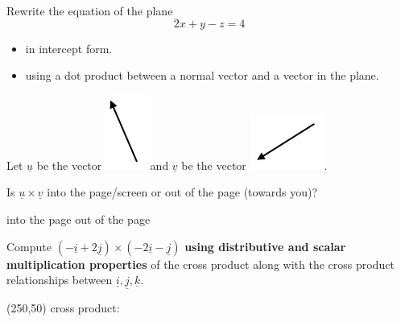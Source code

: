 \documentclass[12pt,letterpaper,noanswers]{exam}
\newcommand{\mb}[1]{\underline{#1}}
\begin{document}
 \pdfpageheight 11in 
  \pdfpagewidth 8.5in



\begin{questions}
\item Rewrite the equation of the plane
\[2x + y - z = 4 \]
\begin{itemize}
    \item in intercept form.
    \item using a dot product between a normal vector and a vector in the plane.
\end{itemize}

\vfill

\item \begin{parts}
\item Let $\mb{u}$ be the vector \includegraphics[scale=0.5]{img/C06p2a.png} and $\mb{v}$ be the vector \includegraphics[scale=0.5]{img/C06p2b.png}.

Is $\mb{u}\times\mb{v}$ into the page/screen or out of the page (towards you)?

\vspace{1in}

\begin{oneparcheckboxes}
\choice into the page
\choice out of the page
\end{oneparcheckboxes}

\item Compute $(-\mb{i}+2\mb{j})\times(-2\mb{i}-\mb{j})$
\textbf{using distributive and scalar multiplication properties} of the cross product along with the cross product relationships between $\mb{i},\mb{j},\mb{k}$.

\framebox(250,50){ cross product:\hfill }
\vspace{1.5in}
\end{parts}
\end{questions}
\end{document}
